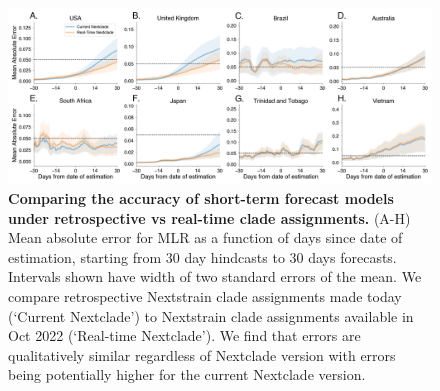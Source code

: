 
\begin{figure}[t!]
	\centering
	\includegraphics[width=0.9\textwidth=0.01]{./supp_figures/mean_absolute_error_at_lead_nextclade_version_comparison.png}
	\caption{
		\textbf{Comparing the accuracy of short-term forecast models under retrospective vs real-time clade assignments.}
        (A-H) Mean absolute error for MLR as a function of days since date of estimation, starting from 30 day hindcasts to 30 days forecasts.
        Intervals shown have width of two standard errors of the mean.
			  We compare retrospective Nextstrain clade assignments made today (`Current Nextclade') to Nextstrain clade assignments available in Oct 2022 (`Real-time Nextclade').
        We find that errors are qualitatively similar regardless of Nextclade version with errors being potentially higher for the current Nextclade version.
	}
	\label{fig:S9}
\end{figure}

\def\forecastcomparisonnextclade#1#2#3{
    \begin{figure}[t!]
        \centering
        \texttt{[image: ./supp\_figures/forecast-comparison-by-nextclade-version-\#3.png]}
        \caption{
            \textbf{Forecasts for #2 using clade designations under retrospective vs real-time clade assignments}
        Forecasts from MLR fit to data generated using retrospective Nextstrain clade designations (`Current Nextclade') (A) and Nextstrain clade assignments available in Oct 2022 (`Real-time Nextclade') (B).
        }
        \label{fig:#1}
    \end{figure}
}

